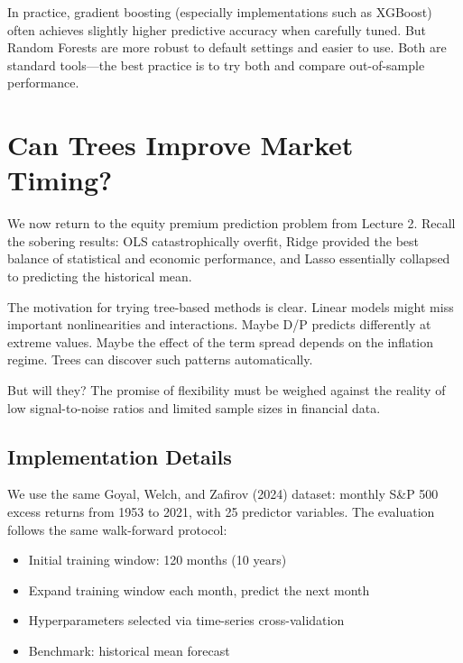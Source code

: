 \documentclass[11pt,a4paper]{article}
\begin{document}
In practice, gradient boosting (especially implementations such as XGBoost) often achieves slightly higher predictive accuracy when carefully tuned. But Random Forests are more robust to default settings and easier to use. Both are standard tools---the best practice is to try both and compare out-of-sample performance.

\section{Can Trees Improve Market Timing?}

We now return to the equity premium prediction problem from Lecture 2. Recall the sobering results: OLS catastrophically overfit, Ridge provided the best balance of statistical and economic performance, and Lasso essentially collapsed to predicting the historical mean.

The motivation for trying tree-based methods is clear. Linear models might miss important nonlinearities and interactions. Maybe D/P predicts differently at extreme values. Maybe the effect of the term spread depends on the inflation regime. Trees can discover such patterns automatically.

But will they? The promise of flexibility must be weighed against the reality of low signal-to-noise ratios and limited sample sizes in financial data.

\subsection{Implementation Details}

We use the same Goyal, Welch, and Zafirov (2024) dataset: monthly S\&P 500 excess returns from 1953 to 2021, with 25 predictor variables. The evaluation follows the same walk-forward protocol:
\begin{itemize}
    \item Initial training window: 120 months (10 years)
    \item Expand training window each month, predict the next month
    \item Hyperparameters selected via time-series cross-validation
    \item Benchmark: historical mean forecast
\end{itemize}
\end{document}

